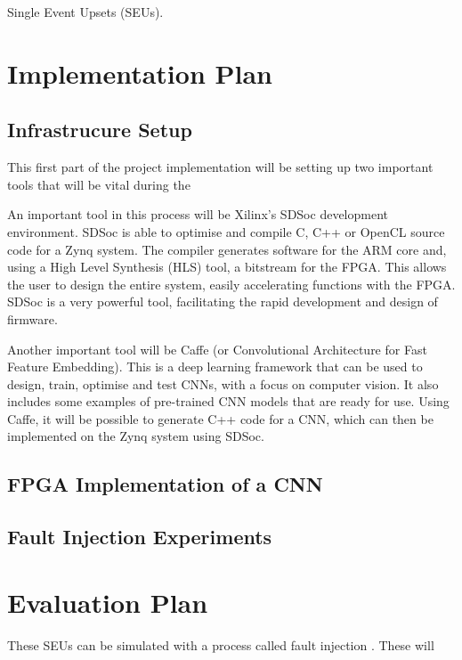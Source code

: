 \documentclass[11pt]{article}
\begin{document}
Single Event Upsets (SEUs).

\section{Implementation Plan}
\label{sec:ImpPlan}

\subsection{Infrastrucure Setup}
\label{sec:ImpPlan-InfSetup}

This first part of the project implementation will be setting up two important tools that will be vital during the 

An important tool in this process will be Xilinx's SDSoc development environment. SDSoc is able to optimise and compile C, C++ or OpenCL source code for a Zynq system. The compiler generates software for the ARM core and, using a High Level Synthesis (HLS) tool, a bitstream for the FPGA. This allows the user to design the entire system, easily accelerating functions with the FPGA. SDSoc is a very powerful tool, facilitating the rapid development and design of firmware.

Another important tool will be Caffe (or Convolutional Architecture for Fast Feature Embedding). This is a deep learning framework that can be used to design, train, optimise and test CNNs, with a focus on computer vision\cite{jia2014caffe}. It also includes some examples of pre-trained CNN models that are ready for use. Using Caffe, it will be possible to generate C++ code for a CNN, which can then be implemented on the Zynq system using SDSoc.

\subsection{FPGA Implementation of a CNN}
\label{sec:ImpPlan-FPGAImplOfCnn}

\subsection{Fault Injection Experiments}
\label{sec:ImpPlan-FaultInjExp}

\section{Evaluation Plan}
\label{sec:EvalPlan}

These SEUs can be simulated with a process called fault injection \cite{FaultInjection}. These will 



\nocite{*}
\end{document}
